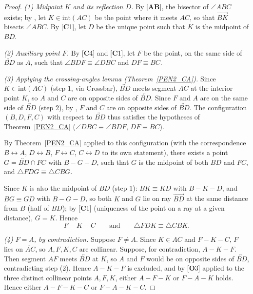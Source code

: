 \documentclass[11pt,a4paper]{article}
\theoremstyle{definition}
\theoremstyle{remark}
\numberwithin{equation}{section}
\begin{document}
\begin{proof}
\emph{(1) Midpoint $K$ and its reflection $D$.} By [\textbf{AB}], the bisector of
$\angle ABC$ exists; by \cite[Crossbar Theorem, p.~82]{Greenberg1993}, let $K\in\mathrm{int}(AC)$
be the point where it meets $AC$, so that $\overrightarrow{BK}$ bisects $\angle ABC$. By
[\textbf{C}1], let $D$ be the unique point such that $K$ is the midpoint of $BD$.

\emph{(2) Auxiliary point $F$.} By [\textbf{C}4] and [\textbf{C}1], let $F$ be the point, on the same
side of $\overleftrightarrow{BD}$ as $A$, such that $\angle BDF\equiv\angle DBC$ and
$DF\equiv BC$.

\emph{(3) Applying the crossing-angles lemma (Theorem~\ref{PEN2_CA}).} Since $K\in\mathrm{int}(AC)$
(step 1, via Crossbar), $\overleftrightarrow{BD}$ meets segment $AC$ at the interior point
$K$, so $A$ and $C$ are on opposite sides of $\overleftrightarrow{BD}$. Since $F$ and $A$ are
on the same side of $\overleftrightarrow{BD}$ (step 2), by
\cite[Corollary~(iii), p.~77]{Greenberg1993}, $F$ and $C$ are on opposite sides of
$\overleftrightarrow{BD}$. The configuration $(B,D,F,C)$ with respect to
$\overleftrightarrow{BD}$ thus satisfies the hypotheses of Theorem~\ref{PEN2_CA}
($\angle DBC\equiv\angle BDF$, $DF\equiv BC$).

By Theorem~\ref{PEN2_CA} applied to this configuration (with the correspondence
$B\leftrightarrow A$, $D\leftrightarrow B$, $F\leftrightarrow C$, $C\leftrightarrow D$ to its
own statement), there exists a point $G=\overleftrightarrow{BD}\cap FC$ with $B-G-D$, such
that $G$ is the midpoint of both $BD$ and $FC$, and $\triangle FDG\equiv\triangle CBG$.

Since $K$ is also the midpoint of $BD$ (step 1): $BK\equiv KD$ with $B-K-D$, and
$BG\equiv GD$ with $B-G-D$, so both $K$ and $G$ lie on ray $\overrightarrow{BD}$ at the same
distance from $B$ (half of $BD$); by [\textbf{C}1] (uniqueness of the point on a ray at a
given distance), $G=K$. Hence
\begin{equation*}
F-K-C\qquad\text{and}\qquad\triangle FDK\equiv\triangle CBK.
\end{equation*}

\emph{(4) $F=A$, by contradiction.} Suppose $F\neq A$. Since $K\in AC$ and $F-K-C$, $F$ lies
on $\overleftrightarrow{AC}$, so $A,F,K,C$ are collinear. Suppose, for contradiction,
$A-K-F$. Then segment $AF$ meets $\overleftrightarrow{BD}$ at $K$, so $A$ and $F$ would be on
opposite sides of $\overleftrightarrow{BD}$, contradicting step (2). Hence $A-K-F$ is excluded,
and by [\textbf{O}3] applied to the three distinct collinear
points $A,F,K$, either $A-F-K$ or $F-A-K$ holds. Hence either $A-F-K-C$ or $F-A-K-C$.


\end{proof}
\end{document}
